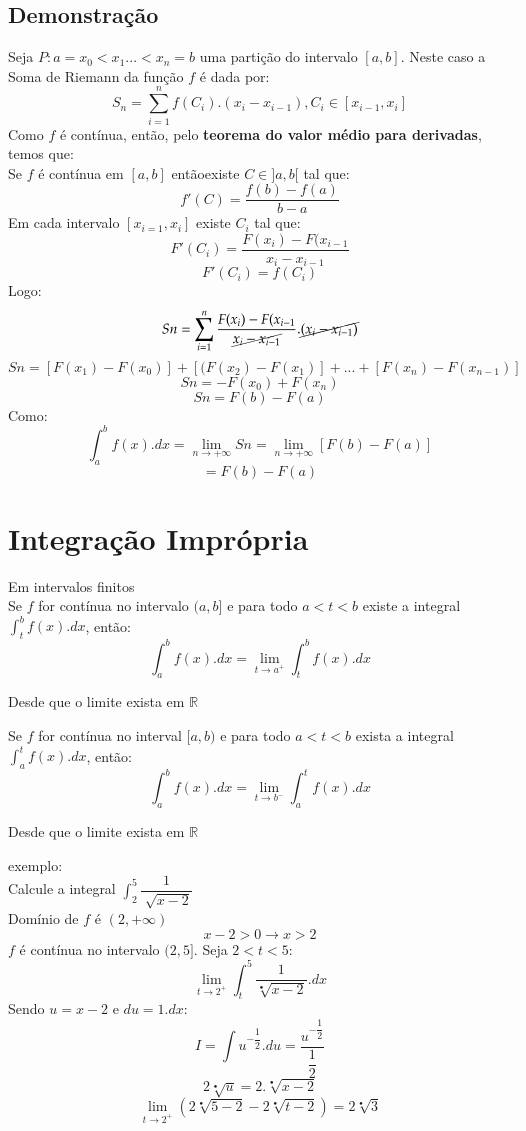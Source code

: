\documentclass{article}
\begin{document}
		\subsection{Demonstração}
			Seja $P: a=x_0<x_1...<x_n=b$ uma partição do intervalo $[a,b]$. Neste caso a Soma de Riemann da função $f$ é dada por:
				$$S_n=\sum_{i=1}^n f(C_i).(x_i-x_{i-1}),C_i \in [x_{i-1},x_i]$$
			Como $f$ é contínua, então, pelo \textbf{teorema do valor médio para derivadas}, temos que:\\
				Se $f$ é contínua em $[a,b]$ entãoexiste $C \in ]a,b[$ tal que:
				$$f'(C) = \dfrac{f(b)-f(a)}{b-a}$$
			Em cada intervalo $[x_{i=1},x_i]$ existe $C_i$ tal que:
				$$F'(C_i)=\dfrac{F(x_i)-F(x_{i-1}}{x_i-x_{i-1}}$$
				$$F'(C_i)=f(C_i)$$
			Logo:
				$$Sn= \sum_{i=1}^n \dfrac{F(x_i)-F(x_{i-1}}{\cancel{x_i-x_{i-1}}}.\cancel{(x_i-x_{i-1})}$$
				$$Sn = [F(x_1)-F(x_0)]+[(F(x_2)-F(x_1)]+...+[F(x_n)-F(x_{n-1})]$$
				$$Sn = -F(x_0)+F(x_n)$$
				$$Sn=F(b)-F(a)$$
			Como:
				$$\int_a^bf(x).dx = \lim_{n\to +\infty}Sn=\lim_{n \to +\infty}[F(b)-F(a)]$$
				$$=F(b)-F(a)$$
	\section{Integração Imprópria}
		Em intervalos finitos\\
		Se $f$ for contínua no intervalo $(a,b]$ e para todo $a<t<b$ existe a integral $\int_t^bf(x).dx$, então:
		$$\int_a^bf(x).dx = \lim_{t \to a^+} \int _t^bf(x).dx$$
		
		\begin{center}
			Desde que o limite exista em $\mathbb{R}$
		\end{center}
		
		Se $f$ for contínua no interval $[a,b)$ e para todo $a<t<b$ exista a integral $\int_a^tf(x).dx$, então:
		$$\int_a^bf(x).dx = \lim_{t \to b^-}\int_a^tf(x).dx$$
		\begin{center}
			Desde que o limite exista em $\mathbb{R}$
		\end{center}
		
		exemplo:\\
		Calcule a integral $\int_2^5\dfrac{1}{\sqrt[]{x-2}}$\\
		Domínio de $f$ é $(2,+\infty)$
		$$x-2>0 \to x>2$$
		$f$ é contínua no intervalo $(2,5]$. Seja $2<t<5$:
		$$\lim_{t \to 2^+} \int_t^5\dfrac{1}{\sqrt[•]{x-2}}.dx$$
		Sendo $u = x-2$ e $du = 1.dx$:
		$$I=\int u^{-\dfrac{1}{2}}.du = \dfrac{u^{-\dfrac{1}{2}}}{\dfrac{1}{2}}$$
		$$2\sqrt[•]{u}=2.\sqrt[•]{x-2}$$
		$$\lim_{t\to 2^+}(2\sqrt[•]{5-2}-2\sqrt[•]{t-2})=2\sqrt[•]{3}$$
\end{document}
